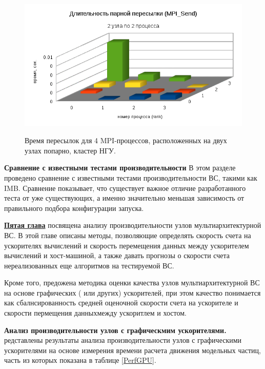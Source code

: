 \begin{figure}[htb]
	\begin{center}
		\includegraphics[height=7cm,keepaspectratio]{images/RomanenkoAASnytnikovAVChernykhIGadaptationtosupercomputerfinalEXTENDEDREFERENCES-img8.png}
	\end{center}
	\caption{ Время пересылок для 4 MPI-процессов, расположенных на двух узлах попарно, кластер НГУ.}
	\label{2nodeNSU}
\end{figure}


\textbf{Сравнение с известными тестами производительности}
В этом разделе проведено сравнение с известными тестами производительности ВС, такими как IMB. Сравнение показывает, что существует важное отличие разработанного теста от уже существующих, а именно значительно меньшая зависимость от правильного подбора конфигурации запуска.  

\underline{\textbf{Пятая глава}} посвящена 
анализу производительности узлов мультиархитектурной ВС.
В этой главе описаны методы, позволяющие определять скорость счета на ускорителях вычислений и скорость перемещения данных между ускорителем вычислений и хост-машиной, а также давать прогнозы о скорости счета нереализованных еще алгоритмов на тестируемой ВС.

Кроме того, предожена методика оценки качества узлов мультиархитектурной ВС на основе графических ( или других) ускорителей, при этом качество понимается как сбалнсированность средней оценочной скорости счета на ускорителе и скорости пермещения данныхмежду ускоритлем и хостом. 

\textbf{Анализ производительности узлов с графическмим ускорителями.}
редставлены результаты анализа производительности узлов с графическими ускорителями на основе измерения времени расчета движения модельных частиц, часть из которых показана в таблице \ref{PerfGPU}.

